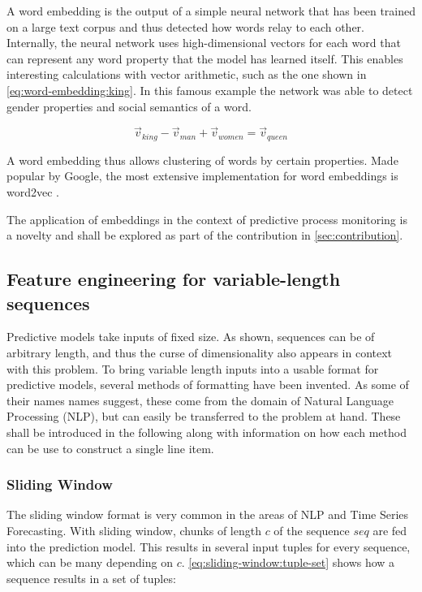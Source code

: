 A word embedding is the output of a simple neural network that has been trained on a large text corpus and thus detected how words relay to each other. Internally, the neural network uses high-dimensional vectors for each word that can represent any word property that the model has learned itself. This enables interesting calculations with vector arithmetic, such as the one shown in \autoref{eq:word-embedding:king}. In this famous example the network was able to detect gender properties and social semantics of a word. 

\begin{equation}
    \label{eq:word-embedding:king}
    \vec{v}_{king} - \vec{v}_{man} + \vec{v}_{women} = \vec{v}_{queen}
\end{equation}

A word embedding thus allows clustering of words by certain properties.
Made popular by Google, the most extensive implementation for word embeddings is word2vec \cite{web:ahogrammer, goldberg2014word2vec}.

The application of embeddings in the context of predictive process monitoring is a novelty and shall be explored as part of the contribution in \autoref{sec:contribution}.

\subsection{Feature engineering for variable-length sequences}
Predictive models take inputs of fixed size. As shown, sequences can be of arbitrary length, and thus the curse of dimensionality also appears in context with this problem. To bring variable length inputs into a usable format for predictive models, several methods of formatting have been invented. As some of their names names suggest, these come from the domain of Natural Language Processing (NLP), but can easily be transferred to the problem at hand. These shall be introduced in the following along with information on how each method can be use to construct a single line item.

\subsubsection*{Sliding Window}
The sliding window format is very common in the areas of NLP and Time Series Forecasting. With sliding window, chunks of length $c$ of the sequence $seq$ are fed into the prediction model. This results in several input tuples for every sequence, which can be many depending on $c$. \autoref{eq:sliding-window:tuple-set} shows how a sequence results in a set of tuples:

